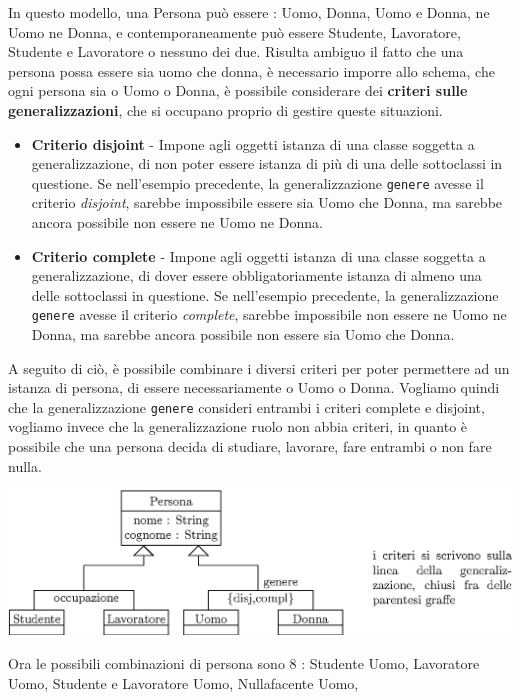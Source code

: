 \documentclass[12pt, letterpaper]{article}
\newcommand{\code}[1]{\colorbox{light-gray}{\texttt{#1}}}
\begin{document}
In questo modello, una Persona può essere : Uomo, Donna, Uomo e Donna, ne Uomo ne Donna, e contemporaneamente
può essere Studente, Lavoratore, Studente e Lavoratore o nessuno dei due. Risulta ambiguo il fatto che una persona
possa essere sia uomo che donna, è necessario imporre allo schema, che ogni persona sia o Uomo o Donna, è possibile
considerare dei \textbf{criteri sulle generalizzazioni}, che si occupano proprio di gestire queste situazioni.\begin{itemize}
    \item \textbf{Criterio disjoint} - Impone agli oggetti istanza di una classe soggetta a generalizzazione, di non poter
          essere istanza di più di una delle sottoclassi in questione. Se nell'esempio precedente, la generalizzazione
          \code{genere} avesse il criterio \textit{disjoint}, sarebbe impossibile essere sia Uomo che Donna, ma
          sarebbe ancora possibile non essere ne Uomo ne Donna.
    \item \textbf{Criterio complete} - Impone agli oggetti istanza di una classe soggetta a generalizzazione,
          di dover essere obbligatoriamente istanza di almeno una delle sottoclassi in questione. Se nell'esempio precedente, la generalizzazione
          \code{genere} avesse il criterio \textit{complete}, sarebbe impossibile non essere ne Uomo ne Donna, ma
          sarebbe ancora possibile non essere sia Uomo che Donna.
\end{itemize}
A seguito di ciò, è possibile combinare i diversi criteri per poter permettere ad un istanza di persona, di essere
necessariamente o Uomo o Donna. Vogliamo quindi che la generalizzazione \code{genere} consideri entrambi i criteri
complete e disjoint, vogliamo invece che la generalizzazione ruolo non abbia criteri, in quanto è possibile che una
persona decida di studiare, lavorare, fare entrambi o non fare nulla. \begin{center}
    \includegraphics[width=1\textwidth ]{images/isa3.eps}
\end{center}
Ora le possibili combinazioni di persona sono 8 : Studente Uomo,
Lavoratore Uomo,
Studente e Lavoratore Uomo,
Nullafacente Uomo,
\end{document}
